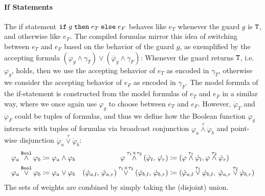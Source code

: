 \paragraph{If Statements}
The if statement $\textnormal{\texttt{if}}\;{g}\;\texttt{then}\; e_T \; \textnormal{\texttt{else}}\; e_F $ behaves like $e_T$ whenever the guard $g$ is $\texttt{T}$, and otherwise like $e_F$.
The compiled formulas mirror this idea of switching between $e_T$ and $e_F$ based on the behavior of the guard $g$, as exemplified by the accepting formula $(\varphi_g \land \gamma_T) \lor (\overline\varphi_g \land \gamma_F)$:
Whenever the guard returns $\texttt{T}$, i.e.\ $\varphi_g$, holds, then we use the accepting behavior of $e_T$ as encoded in $\gamma_T$, otherwise we consider the accepting behavior of $e_F$ as encoded in $\gamma_F$.
The model formula of the if-statement is constructed from the model formulas of $e_T$ and $e_F$ in a similar way, where we once again use $\varphi_g$ to choose between $e_T$ and $e_F$. 
However, $\dot{\varphi}_T$ and $\dot{\varphi}_F$ could be tuples of formulas, and thus we define how the Boolean function $\varphi_g$ interacts with tuples of formulas via broadcast conjunction $\varphi_a \overset{\tau}{\land} \dot{\varphi}_b$ and point-wise disjunction $\dot{\varphi}_a \overset{\tau}{\lor} \dot{\varphi}_b$:
\begin{align*}
	\varphi_a \overset{\texttt{Bool}}{\land} \varphi_b &\coloneq \varphi_a \land \varphi_b
	&
	\varphi \overset{\tau_1 \times \tau_2}{\land} (\dot{\varphi}_l,\, \dot{\varphi_r}) &\coloneq( \varphi \overset{\tau_1}{\land} \dot{\varphi}_l, \varphi \overset{\tau_2}{\land} \dot{\varphi}_r) \\
	\varphi_a \overset{\texttt{Bool}}{\lor} \varphi_b &\coloneq \varphi_a \lor \varphi_b
	&
	(\dot{\varphi}_{a,l},\, \dot{\varphi}_{a,r}) \overset{\tau_1 \times \tau_2}{\lor} (\dot{\varphi}_{b,l},\, \dot{\varphi}_{b,r}) &\coloneq(  \dot{\varphi}_{a,l} \overset{\tau_1}{\lor} \dot{\varphi}_{b,l},\; \dot{\varphi}_{a,r} \overset{\tau_2}{\lor} \dot{\varphi}_{b,r})
\end{align*}
The sets of weights are combined by simply taking the (disjoint) union.


